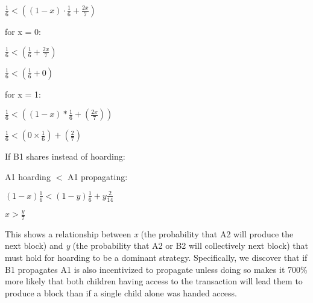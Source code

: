 \documentclass[oneside]{article}   	%
\begin{document}
\begin{multicols}{2}
\begin{adjustwidth}{1.5em}{1.5em}
	\begin{math}
\frac{1}{6} < \left( (1 - x) \cdot \frac{1}{6} + \frac{2x}{7} \right)
	\end{math}
\end{adjustwidth}
\normalsize

for x = 0:

\large
\begin{adjustwidth}{1.5em}{1.5em} 
	\begin{math}
\frac{1}{6} < \left(\frac{1}{6} + \frac{2x}{7}\right)
	\end{math}

	\begin{math}
 \frac{1}{6} < \left(\frac{1}{6} + 0\right)
	\end{math}
\end{adjustwidth}
\normalsize

for x = 1:

\large
\begin{adjustwidth}{1.5em}{1.5em} 
	\begin{math}
\frac{1}{6} < \left(\left(1 - x \right)*\frac{1}{6} + \left(\frac{2x}{7}\right)\right)
	\end{math}

	\begin{math}
\frac{1}{6} < \left( 0 \times \frac{1}{6} \right) + \left( \frac{2}{7} \right)
	\end{math}
\end{adjustwidth}
\normalsize


If B1 shares instead of hoarding:

A1 hoarding \begin{math}<\end{math} A1 propagating:

\large
\begin{adjustwidth}{1.5em}{1.5em} 
	\begin{math}
(1 - x) \frac{1}{6} < \left(1 - y\right) \frac{1}{6} + y \frac{2}{14}
	\end{math}

	\begin{math}
x > \frac{y}{7}
	\end{math}
\end{adjustwidth}
\normalsize

This shows a relationship between \textit{x} (the probability that A2 will produce the next block) and \textit{y} (the probability that A2 or B2 will collectively next block) that must hold for hoarding to be a dominant strategy. Specifically, we discover that if B1 propagates A1 is also incentivized to propagate unless doing so makes it 700\% more likely that both children having access to the transaction will lead them to produce a block than if a single child alone was handed access.


\end{multicols}
\end{document}
